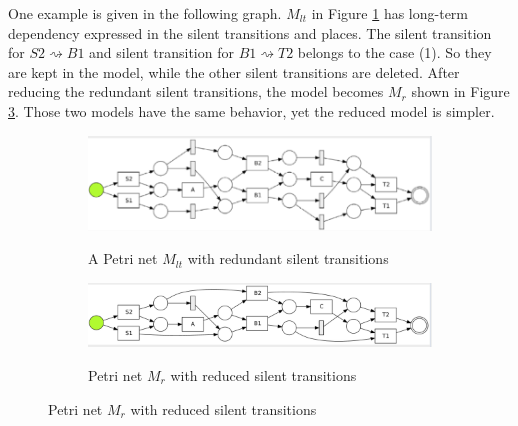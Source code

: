One example is given in the following graph. $M_{lt}$ in Figure \ref{fig:with-lt} has long-term dependency expressed in the silent transitions and places. The silent transition for $S2 \rightsquigarrow B1 $ and silent transition for $B1 \rightsquigarrow T2$ belongs to the case (1). So they are kept in the model, while the other silent transitions are deleted. After reducing the redundant silent transitions, the model becomes $M_r$ shown in Figure \ref{fig:reduced-lt}. Those two models have the same behavior, yet the reduced model is simpler.
\begin{figure}[!h]
	\centering
	\begin{subfigure}[a]{\textwidth}
		\includegraphics[width=\textwidth]{figures/algorithm/dfg-IM-pn-with-lt.png}
		\label{fig:with-lt}
		\caption{A Petri net $M_{lt}$ with redundant silent transitions}
	\end{subfigure}
	\hfill
	\begin{subfigure}[b]{\textwidth}
		\centering
		\includegraphics[width=\linewidth]{figures/algorithm/dfg-IM-pn-with-lt-reduced.png}
		\label{fig:reduced-lt}
		\caption{Petri net $M_r$ with reduced silent transitions}
	\end{subfigure}
\end{figure}

